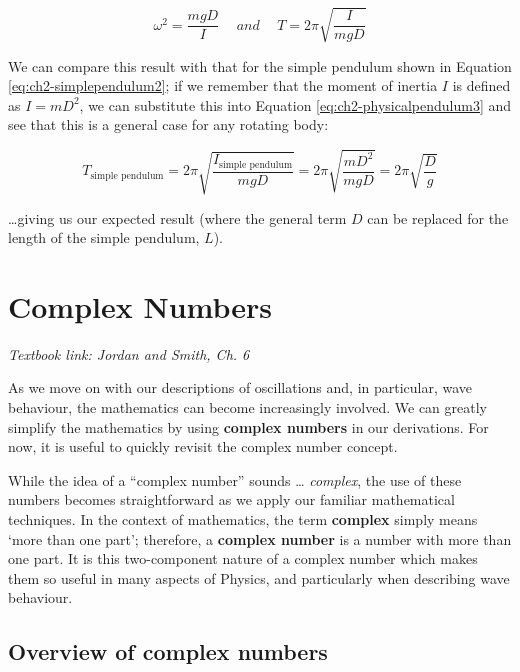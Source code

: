 \documentclass[
]{book}
\begin{document}
\begin{equation}
\omega^2 = \frac{mgD}{I} \hspace{15pt} and \hspace{15pt} T = 2\pi \sqrt{\frac{I}{mgD}}
\label{eq:ch2-physicalpendulum3}
\end{equation}

We can compare this result with that for the simple pendulum shown in Equation \eqref{eq:ch2-simplependulum2}; if we remember that the moment of inertia \(I\) is defined as \(I = mD^2\), we can substitute this into Equation \eqref{eq:ch2-physicalpendulum3} and see that this is a general case for any rotating body:

\begin{equation}
T_\textrm{simple pendulum} = 2\pi \sqrt{\frac{I_\textrm{simple pendulum}}{mgD}} = 2\pi \sqrt{\frac{mD^2}{mgD}} = 2\pi \sqrt{\frac{D}{g}}
\end{equation}

\ldots giving us our expected result (where the general term \(D\) can be replaced for the length of the simple pendulum, \(L\)).

\hypertarget{sec:ch3-complexnumbers}{%
\chapter{Complex Numbers}\label{sec:ch3-complexnumbers}}

\emph{Textbook link: Jordan and Smith, Ch. 6}

As we move on with our descriptions of oscillations and, in particular, wave behaviour, the mathematics can become increasingly involved. We can greatly simplify the mathematics by using \textbf{complex numbers} in our derivations. For now, it is useful to quickly revisit the complex number concept.

While the idea of a ``complex number'' sounds \ldots{} \emph{complex}, the use of these numbers becomes straightforward as we apply our familiar mathematical techniques. In the context of mathematics, the term \textbf{complex} simply means `more than one part'; therefore, a \textbf{complex number} is a number with more than one part. It is this two-component nature of a complex number which makes them so useful in many aspects of Physics, and particularly when describing wave behaviour.

\hypertarget{sec:ch3-complexoverview}{%
\section{Overview of complex numbers}\label{sec:ch3-complexoverview}}
\end{document}
